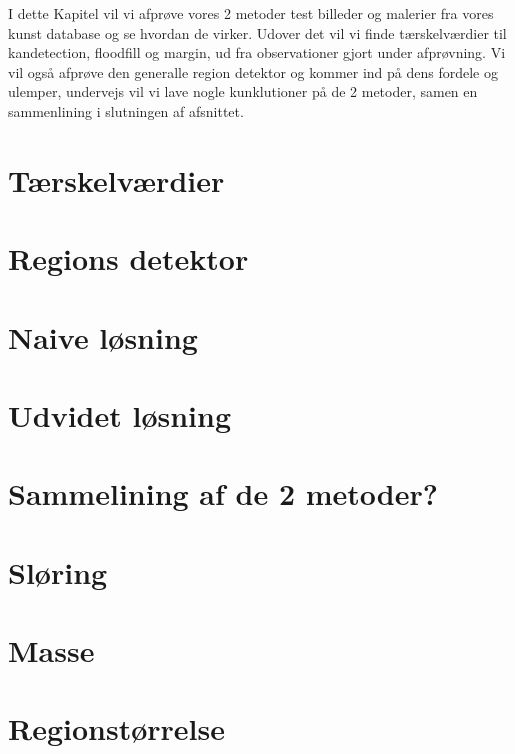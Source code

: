 {
{\sffamily
I dette Kapitel vil vi afprøve vores 2 metoder test billeder og malerier
fra vores kunst database og se hvordan de virker. Udover det vil vi
finde tærskelværdier til kandetection, floodfill og margin, ud fra
observationer gjort under afprøvning. Vi vil også afprøve den generalle
region detektor og kommer ind på dens fordele og ulemper, undervejs vil
vi lave nogle kunklutioner på de 2 metoder, samen en sammenlining i
slutningen af afsnittet. }

\section{Tærskelværdier\label{terskelverdi}}

\clearpage

\section{Regions detektor\label{region_detektor}}

\clearpage

\section{Naive løsning}

\clearpage

\section{Udvidet løsning}

\clearpage

\section{Sammelining af de 2 metoder?}

\clearpage

\section{Sløring}

\clearpage

\section{Masse}

\clearpage

\section{Regionstørrelse \label{region_stoerlse}}

\clearpage
}

